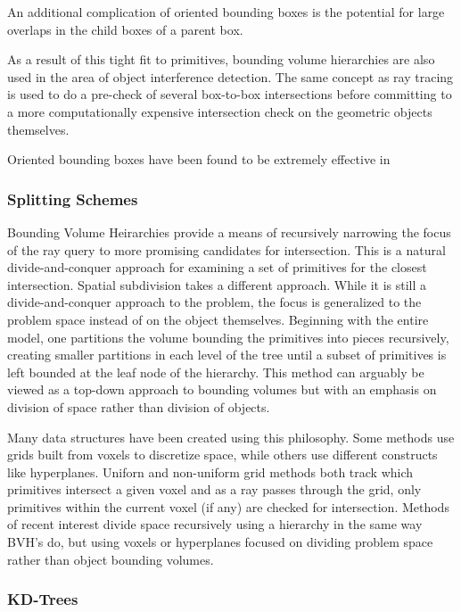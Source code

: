 \documentclass[12pt, a4paper]{article}
\begin{document}
An additional complication of oriented bounding boxes is the potential for large overlaps in the child boxes of a parent box. 

As a result of this tight fit to primitives, bounding volume hierarchies are also used in the area of object interference detection. The same concept as ray tracing is used to do a pre-check of several box-to-box intersections before committing to a more computationally expensive intersection check on the geometric objects themselves.

Oriented bounding boxes have been found to be extremely effective in 


\subsubsection{Splitting Schemes}%

Bounding Volume Heirarchies provide a means of recursively narrowing the focus of the ray query to more promising candidates for intersection. This is a natural divide-and-conquer approach for examining a set of primitives for the closest intersection. Spatial subdivision takes a different approach. \cite{Intro2RT} While it is still a divide-and-conquer approach to the problem, the focus is generalized to the problem space instead of on the object themselves. Beginning with the entire model, one partitions the volume bounding the primitives into pieces recursively, creating smaller partitions in each level of the tree until a subset of primitives is left bounded at the leaf node of the hierarchy. This method can arguably be viewed as a top-down approach to bounding volumes but with an emphasis on division of space rather than division of objects.


Many data structures have been created using this philosophy. Some methods use grids built from voxels to discretize space, while others use different constructs like hyperplanes. Uniforn and non-uniform grid methods both track which primitives intersect a given voxel and as a ray passes through the grid, only primitives within the current voxel (if any) are checked for intersection. Methods of recent interest divide space recursively using a hierarchy in the same way BVH's do, but using voxels or hyperplanes focused on dividing problem space rather than object bounding volumes.


\subsubsection{KD-Trees}%
\end{document}
